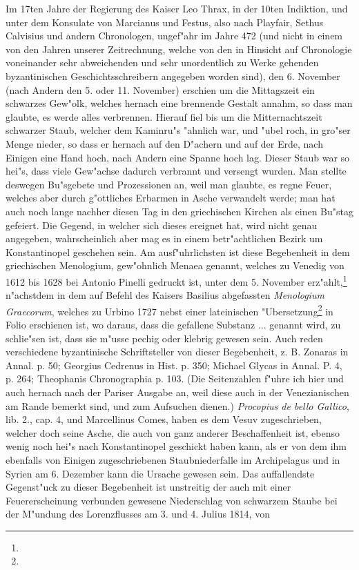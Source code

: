 \documentclass[a4paper, 11pt, oneside, polutonikogreek, german]{article}
\begin{document}
Im 17ten Jahre der Regierung des Kaiser Leo Thrax, in der 10ten Indiktion, und unter dem Konsulate von Marcianus und Festus, also nach Playfair, Sethus Calvisius und andern Chronologen, ungef"ahr im Jahre 472 (und nicht in einem von den Jahren unserer Zeitrechnung, welche von den in Hinsicht auf Chronologie voneinander sehr abweichenden und sehr unordentlich zu Werke gehenden byzantinischen Geschichtsschreibern angegeben worden sind), den 6. November (nach Andern den 5. oder 11. November) erschien um die Mittagszeit ein schwarzes Gew"olk, welches hernach eine brennende Gestalt annahm, so dass man glaubte, es werde alles verbrennen. Hierauf fiel bis um die Mitternachtszeit schwarzer Staub, welcher dem Kaminru"s "ahnlich war, und "ubel roch, in gro"ser Menge nieder, so dass er hernach auf den D"achern und auf der Erde, nach Einigen eine Hand hoch, nach Andern eine Spanne hoch lag. Dieser Staub war so hei"s, dass viele Gew"achse dadurch verbrannt und versengt wurden. Man stellte deswegen Bu"sgebete und Prozessionen an, weil man glaubte, es regne Feuer, welches aber durch g"ottliches Erbarmen in Asche verwandelt werde; man hat auch noch lange nachher diesen Tag in den griechischen Kirchen als einen Bu"stag gefeiert. Die Gegend, in welcher sich dieses ereignet hat, wird nicht genau angegeben, wahrscheinlich aber mag es in einem betr"achtlichen Bezirk um Konstantinopel geschehen sein. Am ausf"uhrlichsten ist diese Begebenheit in dem griechischen Menologium, gew"ohnlich Menaea genannt, welches zu Venedig von 1612 bis 1628 bei Antonio Pinelli gedruckt ist, unter dem 5. November erz"ahlt,\footnote{} n"achstdem in dem auf Befehl des Kaisers Basilius abgefassten \emph{Menologium Graecorum}, welches zu Urbino 1727 nebst einer lateinischen "Ubersetzung\footnote{} in Folio erschienen ist, wo daraus, dass die gefallene Substanz ... genannt wird, zu schlie"sen ist, dass sie m"usse pechig oder klebrig gewesen sein. Auch reden verschiedene byzantinische Schriftsteller von dieser Begebenheit, z. B. Zonaras in Annal. p. 50; Georgius Cedrenus in Hist. p. 350; Michael Glycas in Annal. P. 4, p. 264; Theophanis Chronographia p. 103. (Die Seitenzahlen f"uhre ich hier und auch hernach nach der Pariser Ausgabe an, weil diese auch in der Venezianischen am Rande bemerkt sind, und zum Aufsuchen dienen.) \emph{Procopius de bello Gallico}, lib. 2., cap. 4, und Marcellinus Comes, haben es dem Vesuv zugeschrieben, welcher doch seine Asche, die auch von ganz anderer Beschaffenheit ist, ebenso wenig noch hei"s nach Konstantinopel geschickt haben kann, als er von dem ihm ebenfalls von Einigen zugeschriebenen Staubniederfalle im Archipelagus und in Syrien am 6. Dezember kann die Ursache gewesen sein. Das auffallendste Gegenst"uck zu dieser Begebenheit ist unstreitig der auch mit einer Feuererscheinung verbunden gewesene Niederschlag von schwarzem Staube bei der M"undung des Lorenzflusses am 3. und 4. Julius 1814, von 
\end{document}
